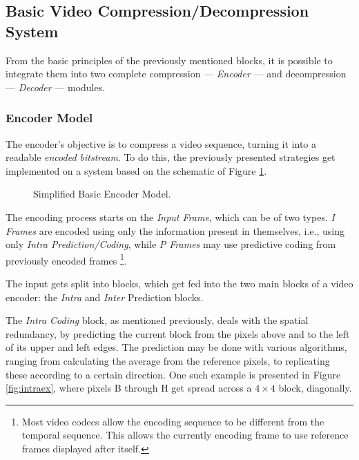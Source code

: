 \subsection{Basic Video Compression/Decompression System}

From the basic principles of the previously mentioned blocks, it is possible to integrate them into two complete compression --- \emph{Encoder} --- and decompression --- \emph{Decoder} --- modules.

\subsubsection{Encoder Model} \label{ssse:encmod}

The encoder's objective is to compress a video sequence, turning it into a readable \emph{encoded bitstream}. To do this, the previously presented strategies get implemented on a system based on the schematic of Figure \ref{fig:basicenc}.

\begin{figure}[!htbp]
    \centering
    
    \caption{Simplified Basic Encoder Model.}
    \label{fig:basicenc}
\end{figure}

The encoding process starts on the \emph{Input Frame}, which can be of two types. \emph{I Frames} are encoded using only the information present in themselves, i.e., using only \emph{Intra Prediction/Coding}, while \emph{P Frames} may use predictive coding from previously encoded frames \footnote{Most video codecs allow the encoding sequence to be different from the temporal sequence. This allows the currently encoding frame to use reference frames displayed after itself.}.

The input gets split into blocks, which get fed into the two main blocks of a video encoder: the \emph{Intra} and \emph{Inter} Prediction blocks.

The \emph{Intra Coding} block, as mentioned previously, deals with the spatial redundancy, by predicting the current block from the pixels above and to the left of its upper and left edges. The prediction may be done with various algorithms, ranging from calculating the average from the reference pixels, to replicating these according to a certain direction. One such example is presented in Figure \ref{fig:intraex}, where pixels B through H get spread across a $4\times 4$ block, diagonally.

